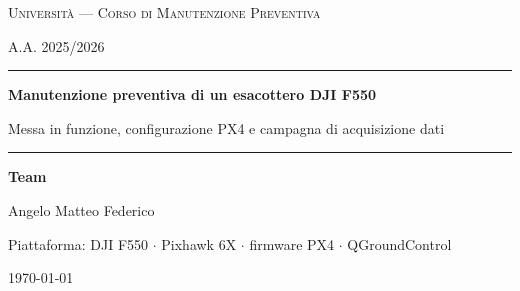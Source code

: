 \documentclass[11pt,a4paper,oneside]{report}
\begin{document}
\begin{titlepage}
\centering
\vspace*{1.5cm}
{\scshape\large Universit\`a --- Corso di Manutenzione Preventiva\par}
{\scshape A.A. 2025/2026\par}
\vspace{2.5cm}
{\color{blunavy}\rule{\linewidth}{1.2pt}}\par\vspace{0.6cm}
{\Huge\bfseries\color{blunavy} Manutenzione preventiva di un esacottero DJI F550\par}
\vspace{0.5cm}
{\Large Messa in funzione, configurazione PX4 e campagna di acquisizione dati\par}
\vspace{0.4cm}
{\color{blunavy}\rule{\linewidth}{1.2pt}}\par

\vspace{2.5cm}
{\large\textbf{Team}\par}
\vspace{0.3cm}
{\large Angelo \quad\textbullet\quad Matteo \quad\textbullet\quad Federico\par}

\vfill
{\large Piattaforma: DJI F550 $\cdot$ Pixhawk 6X $\cdot$ firmware PX4 $\cdot$ QGroundControl\par}
\vspace{0.5cm}
{\large \today\par}
\end{titlepage}

\tableofcontents
\thispagestyle{empty}
\cleardoublepage

\setcounter{page}{1}











\appendix

\end{document}
